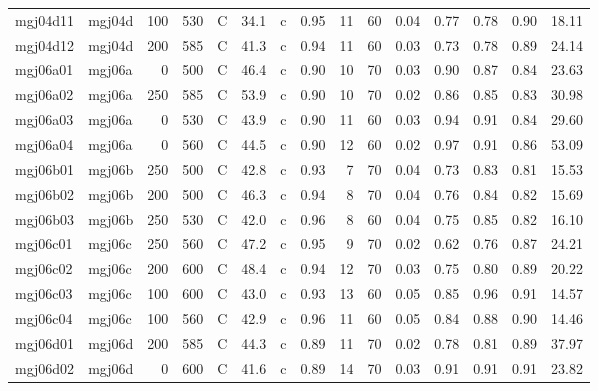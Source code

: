 \documentclass{article}
\begin{document}
\begin{landscape}
\begin{longtable}{llrrlrlrrrrrrrr}
    mgj04d11 &     mgj04d &  100 &  530 &     C &    34.1 &   c &  0.95 &  11 &         60 &  0.04 &  0.77 &  0.78 &  0.90 &   18.11 \\
    mgj04d12 &     mgj04d &  200 &  585 &     C &    41.3 &   c &  0.94 &  11 &         60 &  0.03 &  0.73 &  0.78 &  0.89 &   24.14 \\
    mgj06a01 &     mgj06a &    0 &  500 &     C &    46.4 &   c &  0.90 &  10 &         70 &  0.03 &  0.90 &  0.87 &  0.84 &   23.63 \\
    mgj06a02 &     mgj06a &  250 &  585 &     C &    53.9 &   c &  0.90 &  10 &         70 &  0.02 &  0.86 &  0.85 &  0.83 &   30.98 \\
    mgj06a03 &     mgj06a &    0 &  530 &     C &    43.9 &   c &  0.90 &  11 &         60 &  0.03 &  0.94 &  0.91 &  0.84 &   29.60 \\
    mgj06a04 &     mgj06a &    0 &  560 &     C &    44.5 &   c &  0.90 &  12 &         60 &  0.02 &  0.97 &  0.91 &  0.86 &   53.09 \\
    mgj06b01 &     mgj06b &  250 &  500 &     C &    42.8 &   c &  0.93 &   7 &         70 &  0.04 &  0.73 &  0.83 &  0.81 &   15.53 \\
    mgj06b02 &     mgj06b &  200 &  500 &     C &    46.3 &   c &  0.94 &   8 &         70 &  0.04 &  0.76 &  0.84 &  0.82 &   15.69 \\
    mgj06b03 &     mgj06b &  250 &  530 &     C &    42.0 &   c &  0.96 &   8 &         60 &  0.04 &  0.75 &  0.85 &  0.82 &   16.10 \\
    mgj06c01 &     mgj06c &  250 &  560 &     C &    47.2 &   c &  0.95 &   9 &         70 &  0.02 &  0.62 &  0.76 &  0.87 &   24.21 \\
    mgj06c02 &     mgj06c &  200 &  600 &     C &    48.4 &   c &  0.94 &  12 &         70 &  0.03 &  0.75 &  0.80 &  0.89 &   20.22 \\
    mgj06c03 &     mgj06c &  100 &  600 &     C &    43.0 &   c &  0.93 &  13 &         60 &  0.05 &  0.85 &  0.96 &  0.91 &   14.57 \\
    mgj06c04 &     mgj06c &  100 &  560 &     C &    42.9 &   c &  0.96 &  11 &         60 &  0.05 &  0.84 &  0.88 &  0.90 &   14.46 \\
    mgj06d01 &     mgj06d &  200 &  585 &     C &    44.3 &   c &  0.89 &  11 &         70 &  0.02 &  0.78 &  0.81 &  0.89 &   37.97 \\
    mgj06d02 &     mgj06d &    0 &  600 &     C &    41.6 &   c &  0.89 &  14 &         70 &  0.03 &  0.91 &  0.91 &  0.91 &   23.82 \\

\end{longtable}
\end{landscape}
\end{document}
